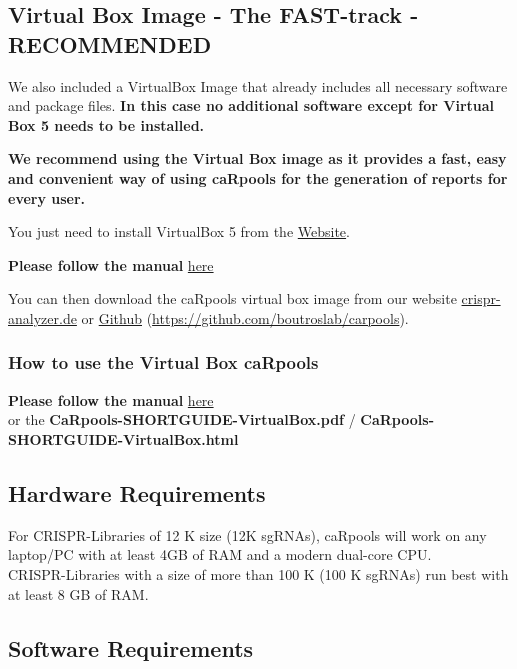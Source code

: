 \documentclass[]{article}
\begin{document}
\subsection{Virtual Box Image - The FAST-track -
RECOMMENDED}\label{virtual-box-image---the-fast-track---recommended}

We also included a VirtualBox Image that already includes all necessary
software and package files. \textbf{In this case no additional software
except for Virtual Box 5 needs to be installed.}

\textbf{We recommend using the Virtual Box image as it provides a fast,
easy and convenient way of using caRpools for the generation of reports
for every user.}

You just need to install VirtualBox 5 from the
\href{https://www.virtualbox.org}{Website}.

\textbf{Please follow the manual}
\href{https://github.com/boutroslab/caRpools/blob/master/docs/CaRpools-SHORTGUIDE-VirtualBox.Rmd}{here}

You can then download the caRpools virtual box image from our website
\href{http://www.crispr-analyzer.de}{crispr-analyzer.de} or
\href{https://github.com/boutroslab/carpools}{Github}
(\url{https://github.com/boutroslab/carpools}).

\subsubsection{How to use the Virtual Box
caRpools}\label{how-to-use-the-virtual-box-carpools}

\textbf{Please follow the manual}
\href{https://github.com/boutroslab/caRpools/blob/master/docs/CaRpools-SHORTGUIDE-VirtualBox.Rmd}{here}\\
or the \textbf{CaRpools-SHORTGUIDE-VirtualBox.pdf} /
\textbf{CaRpools-SHORTGUIDE-VirtualBox.html}

\subsection{Hardware Requirements}\label{hardware-requirements}

For CRISPR-Libraries of 12 K size (12K sgRNAs), caRpools will work on
any laptop/PC with at least 4GB of RAM and a modern dual-core CPU.\\
CRISPR-Libraries with a size of more than 100 K (100 K sgRNAs) run best
with at least 8 GB of RAM.

\subsection{Software Requirements}\label{software-requirements}
\end{document}
